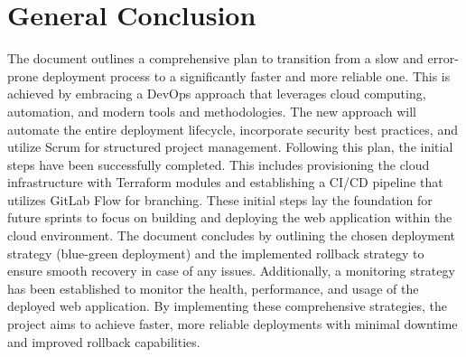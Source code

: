 \chapter*{General Conclusion}

The document outlines a comprehensive plan to transition from a slow and error-prone deployment process to a significantly faster and more reliable one. This is achieved by embracing a DevOps approach that leverages cloud computing, automation, and modern tools and methodologies. The new approach will automate the entire deployment lifecycle, incorporate security best practices, and utilize Scrum for structured project management.
Following this plan, the initial steps have been successfully completed. This includes provisioning the cloud infrastructure with Terraform modules and establishing a CI/CD pipeline that utilizes GitLab Flow for branching.  These initial steps lay the foundation for future sprints to focus on building and deploying the web application within the cloud environment.
The document concludes by outlining the chosen deployment strategy (blue-green deployment) and the implemented rollback strategy to ensure smooth recovery in case of any issues. Additionally, a monitoring strategy has been established to monitor the health, performance, and usage of the deployed web application. By implementing these comprehensive strategies, the project aims to achieve faster, more reliable deployments with minimal downtime and improved rollback capabilities.